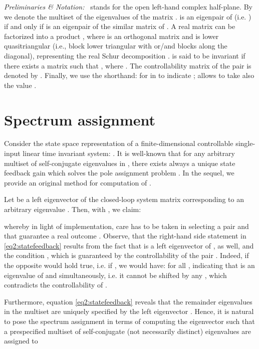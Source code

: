 \documentclass[conference]{IEEEtran}
\begin{document}
\emph{Preliminaries \& Notation:~}  stands for the open
left-hand complex half-plane. By  we denote the
multiset of the eigenvalues of the matrix .  is an eigenpair of 
(i.e. ) if and only if  is an
eigenpair of the similar matrix of . A real matrix  can be
factorized into a product , where  is an orthogonal matrix
and  is lower quasitriangular (i.e., block lower triangular with
 or/and  blocks along the diagonal), representing the real
Schur decomposition \cite{qref:matrix-analysis-HJ-vol1}.
 is said to be invariant if
there exists a matrix  such that , where
.  The controllability
matrix  of the pair  is denoted by .
Finally, we use the shorthand:
 for  in  to indicate
;  allows  to take also
the value .
















\vspace{-2pt}
\section{Spectrum assignment}
\label{sec:Eigenvalue assignment}


Consider the state space representation of a finite-dimensional controllable  single-input linear time invariant  system:
. It is well-known that for any arbitrary multiset  of
{self-conjugate} eigenvalues   in
, there exists always a unique state feedback gain  which solves the pole assignment problem \cite{Kailat80}. In the sequel, we provide an original method for computation of .


Let  be a left  eigenvector of the closed-loop system matrix  corresponding to an arbitrary eigenvalue . Then, with , we claim:

whereby in light of implementation, care has to be taken in selecting a pair  and  that guarantee a real outcome .
Observe, that  the right-hand side statement in
\eqref{eq2:statefeedback} results from the fact that  is a left eigenvector of , as well, and the
condition , which is guaranteed by the
controllability of the pair . Indeed, if the opposite would
hold true, i.e. if , we would have:
 for all
, indicating that  is an eigenvalue of  and 
simultaneously, i.e. it cannot be shifted by any , which
contradicts the controllability of .


Furthermore, equation \eqref{eq2:statefeedback} reveals that the
remainder eigenvalues in the multiset  are
uniquely specified by the left eigenvector . Hence, it
is natural to pose the spectrum assignment in terms of computing
the eigenvector  such that a prespecified multiset of
self-conjugate (not necessarily distinct) eigenvalues
 are assigned to
\end{document}
